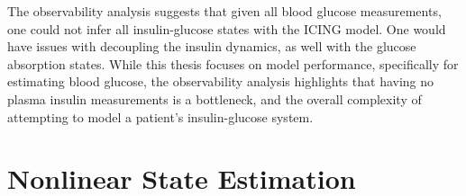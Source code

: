 \documentclass[nomenclature, english, bibtex]{kththesis}
\begin{document}
The observability analysis suggests that given all blood glucose measurements, one could not infer all insulin-glucose states with the \gls{ICING} model. One would have issues with decoupling the insulin dynamics, as well with the glucose absorption states. While this thesis focuses on model performance, specifically for estimating blood glucose, the observability analysis highlights that having no plasma insulin measurements is a bottleneck, and the overall complexity of attempting to model a patient's insulin-glucose system.

\section{Nonlinear State Estimation}

\end{document}
